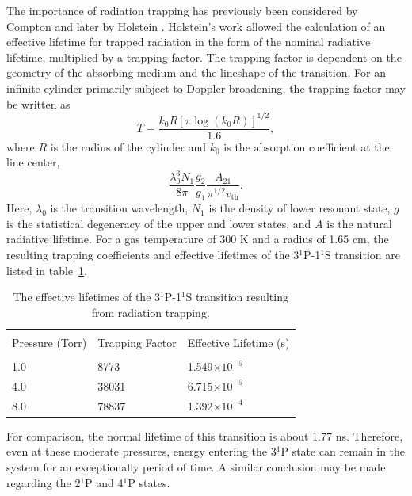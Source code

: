 The importance of radiation trapping has previously been considered by Compton
\cite{Compton1922} and later by Holstein \cite{Holstein1947, Holstein1951}.
Holstein's work allowed the calculation of an effective lifetime for trapped
radiation in the form of the nominal radiative lifetime, multiplied by a
trapping factor. The trapping factor is dependent on the geometry of the
absorbing medium and the lineshape of the transition. For an infinite cylinder
primarily subject to Doppler broadening, the trapping factor may be written as
\begin{equation}
  T = \frac{k_0R\left[\pi\log(k_0R)\right]^{1/2}}{1.6},
\end{equation}
where $R$ is the radius of the cylinder and $k_0$ is the absorption coefficient
at the line center,
\begin{equation}
  \frac{\lambda_0^3N_1}{8\pi} \frac{g_2}{g_1} \frac{A_{21}}{\pi^{1/2}v_\mathrm{th}}.
\end{equation}
Here, $\lambda_0$ is the transition wavelength, $N_1$ is the density of lower
resonant state, $g$ is the statistical degeneracy of the upper and lower states,
and $A$ is the natural radiative lifetime. For a gas temperature of 300 K and a
radius of 1.65 cm, the resulting trapping coefficients and effective lifetimes
of the 3$^1$P-1$^1$S transition are listed in table~\ref{tbl:lifetimes}.
\begin{table}
  \centering
  \caption{The effective lifetimes of the 3$^1$P-1$^1$S transition resulting
    from radiation trapping.}
  \label{tbl:lifetimes}
  \begin{tabular}{lll}
    \toprule \\
    Pressure (Torr) & Trapping Factor & Effective Lifetime (s) \\
    \midrule \\
    1.0             & 8773            & 1.549$\times10^{-5}$   \\
    4.0             & 38031           & 6.715$\times10^{-5}$   \\
    8.0             & 78837           & 1.392$\times10^{-4}$   \\
    \bottomrule
  \end{tabular}
\end{table}
For comparison, the normal lifetime of this transition is about 1.77 ns.
Therefore, even at these moderate pressures, energy entering the 3$^1$P state
can remain in the system for an exceptionally period of time. A similar
conclusion may be made regarding the 2$^1$P and 4$^1$P states. 

